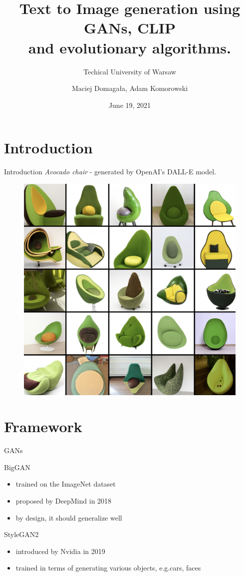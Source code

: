 \documentclass[t]{beamer}
\title{Text to Image generation using GANs,  CLIP  \\ and evolutionary algorithms.}
\subtitle{Techical University of Warsaw}
\author{Maciej Domagała, Adam Komorowski}
\date{June 19, 2021}
\begin{document}
\begin{frame}
\titlepage
\end{frame}

\section{Introduction}

\begin{frame}{Introduction}
\textit{Avocado chair} - generated by OpenAI's DALL-E model.
\begin{figure}[ht!]
    \centering
    \includegraphics[scale=0.2]{dalle_avocado.png}
\end{figure} 
\end{frame}

\section{Framework}


\begin{frame}[c]{GANs}
\begin{block}{BigGAN}
\begin{itemize}
\item trained on the ImageNet dataset
\item proposed by DeepMind in 2018
\item by design, it should generalize well
\end{itemize}
\end{block}
\begin{block}{StyleGAN2}
\begin{itemize}
\item introduced by Nvidia in 2019
\item trained in terms of generating various objects, e.g.cars, faces
\end{itemize}
\end{block}
\end{frame}
\end{document}
